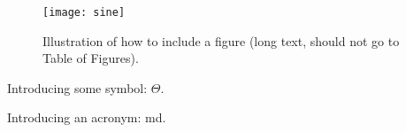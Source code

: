 \begin{figure}[th!]
  \centering
  \medskip
  \texttt{[image: sine]}
  \caption[Short caption for Table of Figures]{Illustration of how to
  include a figure (long text, should not go to Table of Figures).}
  \label{fig:sine}
\end{figure}

Introducing some symbol: $\Theta$.

Introducing an acronym: \gls{md}.

\cleardoublepage

